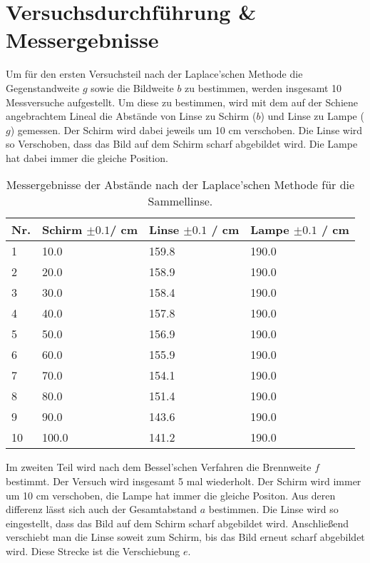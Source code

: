\documentclass[12pt,a4paper,twoside]{article}
\begin{document}
\section{Versuchsdurchführung \& Messergebnisse} %
Um für den ersten Versuchsteil nach der Laplace'schen Methode die Gegenstandweite $g$ sowie die Bildweite $b$ zu bestimmen, werden insgesamt 10 Messversuche aufgestellt. 
Um diese zu bestimmen, wird mit dem auf der Schiene angebrachtem Lineal die Abstände von Linse zu Schirm ($b$) und Linse zu Lampe ($g$) gemessen. 
Der Schirm wird dabei jeweils um 10 cm verschoben. Die Linse wird so Verschoben, dass das Bild auf dem Schirm scharf abgebildet wird. Die Lampe hat dabei immer die gleiche Position. 

\begin{table}[H]
    \centering
    \caption{Messergebnisse der Abstände nach der Laplace'schen Methode für die Sammellinse. }
    \label{tab:messergebnisse Laplace}
    \begin{tabular}{| l | l | l | l |}
        \hline
        Nr.  & Schirm $\pm 0.1 $/ cm & Linse $\pm 0.1 $ / cm & Lampe $\pm 0.1 $ / cm \\
        \hline
        1  & 10.0   & 159.8  & 190.0 \\
        2  & 20.0   & 158.9  & 190.0 \\
        3  & 30.0   & 158.4  & 190.0 \\
        4  & 40.0   & 157.8  & 190.0 \\
        5  & 50.0   & 156.9  & 190.0 \\
        6  & 60.0   & 155.9  & 190.0 \\
        7  & 70.0   & 154.1  & 190.0 \\
        8  & 80.0   & 151.4  & 190.0 \\
        9  & 90.0   & 143.6  & 190.0 \\
        10 & 100.0  & 141.2  & 190.0 \\
        \hline
    \end{tabular}
\end{table}

\noindent
Im zweiten Teil wird nach dem Bessel'schen Verfahren die Brennweite $f$ bestimmt. 
Der Versuch wird insgesamt 5 mal wiederholt. Der Schirm wird immer um 10 cm verschoben, die Lampe hat immer die gleiche Positon. Aus deren differenz lässt sich auch der Gesamtabstand $a$ bestimmen. 
Die Linse wird so eingestellt, dass das Bild auf dem Schirm scharf abgebildet wird. Anschließend verschiebt man die Linse soweit zum Schirm, bis das Bild erneut scharf abgebildet wird. Diese Strecke ist die Verschiebung $e$. 
\end{document}

